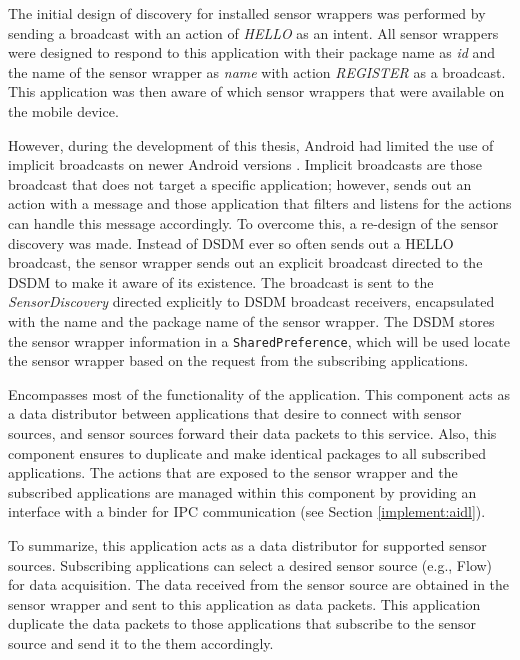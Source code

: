 \begin{description}[font=\normalfont\itshape]
    \item[Sensor Discovery] The initial design of discovery for installed sensor wrappers was performed by sending a broadcast with an action of \textit{HELLO} as an intent. All sensor wrappers were designed to respond to this application with their package name as \textit{id} and the name of the sensor wrapper as \textit{name} with action \textit{REGISTER} as a broadcast. This application was then aware of which sensor wrappers that were available on the mobile device. 
    
    However, during the development of this thesis, Android had limited the use of implicit broadcasts on newer Android versions \cite{broadcasterror}. Implicit broadcasts are those broadcast that does not target a specific application; however, sends out an action with a message and those application that filters and listens for the actions can handle this message accordingly. To overcome this, a re-design of the sensor discovery was made. Instead of DSDM ever so often sends out a HELLO broadcast, the sensor wrapper sends out an explicit broadcast directed to the DSDM to make it aware of its existence. The broadcast is sent to the \textit{SensorDiscovery} directed explicitly to DSDM broadcast receivers, encapsulated with the name and the package name of the sensor wrapper. The DSDM stores the sensor wrapper information in a \verb|SharedPreference|, which will be used locate the sensor wrapper based on the request from the subscribing applications.

    \item[DataStreamDispatchingService] Encompasses most of the functionality of the application. This component acts as a data distributor between applications that desire to connect with sensor sources, and sensor sources forward their data packets to this service. Also, this component ensures to duplicate and make identical packages to all subscribed applications. The actions that are exposed to the sensor wrapper and the subscribed applications are managed within this component by providing an interface with a binder for IPC communication (see Section \ref{implement:aidl}). 

\end{description}


To summarize, this application acts as a data distributor for supported sensor sources. Subscribing applications can select a desired sensor source (e.g., Flow) for data acquisition. The data received from the sensor source are obtained in the sensor wrapper and sent to this application as data packets. This application duplicate the data packets to those applications that subscribe to the sensor source and send it to the them accordingly. 


